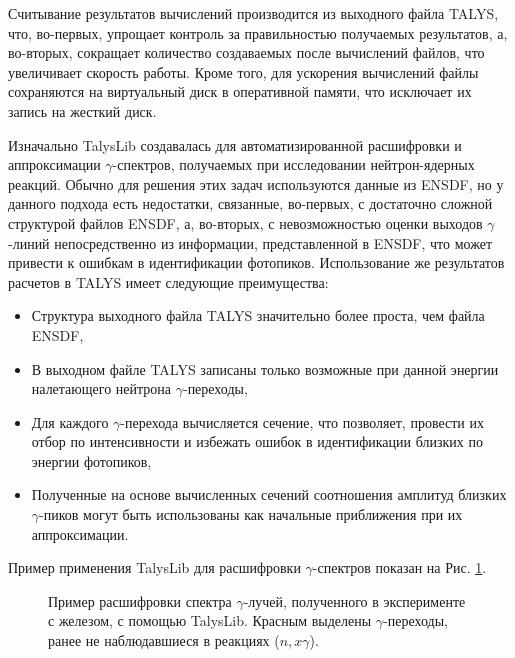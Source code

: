 \documentclass[a4paper,12pt]{extarticle}
\begin{document}
Считывание результатов вычислений производится из выходного файла TALYS, что, во-первых, упрощает контроль за правильностью получаемых результатов, а, во-вторых, сокращает количество создаваемых после вычислений файлов, что увеличивает скорость работы. Кроме того, для ускорения вычислений файлы сохраняются на виртуальный диск в оперативной памяти, что исключает их запись на жесткий диск.\par
Изначально TalysLib создавалась для автоматизированной расшифровки и аппроксимации $\gamma$-спектров, получаемых при исследовании нейтрон-ядерных реакций. Обычно для решения этих задач используются данные из ENSDF, но у данного подхода есть недостатки, связанные, во-первых, с достаточно сложной структурой файлов ENSDF, а, во-вторых, с невозможностью оценки выходов $\gamma$-линий непосредственно из информации, представленной в ENSDF, что может привести к ошибкам в идентификации фотопиков. Использование же результатов расчетов в TALYS имеет следующие преимущества:
\begin{itemize}
\item Структура выходного файла TALYS значительно более проста, чем файла ENSDF,
\item В выходном файле TALYS записаны только возможные при данной энергии налетающего нейтрона $\gamma$-переходы,
\item Для каждого $\gamma$-перехода вычисляется сечение, что позволяет, провести их отбор по интенсивности и избежать ошибок в идентификации близких по энергии фотопиков,
\item Полученные на основе вычисленных сечений соотношения амплитуд близких $\gamma$-пиков могут быть использованы как начальные приближения при их аппроксимации.
\end{itemize}
Пример применения TalysLib для расшифровки $\gamma$-спектров показан на Рис. \ref{fig:SpectrumDecodingExample}.\par
\begin{figure}
\caption{Пример расшифровки спектра $\gamma$-лучей, полученного в эксперименте с железом, с помощью TalysLib. Красным выделены $\gamma$-переходы, ранее не наблюдавшиеся в реакциях ($n,x\gamma$).}
\label{fig:SpectrumDecodingExample}
\end{figure}
\end{document}

